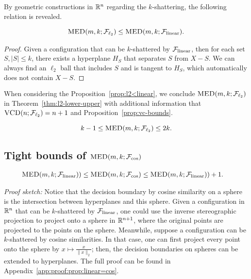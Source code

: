 \documentclass[10pt]{article}
\begin{document}
By geometric constructions in $\mathbb{R}^n$ regarding the $k$-shattering, the following relation is revealed.

\begin{proposition}\label{prop:l2<linear}

$$\textsc{MED}(m, k; \mathcal{F}_{\ell_{2}}) \leq \textsc{MED}(m, k; \mathcal{F}_{\rm linear}). $$

\end{proposition}
\begin{proof}
Given a configuration that can be $k$-shattered by $\mathcal{F}_{\rm linear}$, then for each set $S, |S| \leq k$, there exists a hyperplane $H_S$ that separates $S$ from $X-S$. We can always find an $\ell_2$ ball that includes $S$ and is tangent to $H_S$, which automatically does not contain $X-S$.
\end{proof}
When considering the Proposition~\ref{prop:l2<linear}, we conclude $\textsc{MED}(m, k;\mathcal{F}_{\ell_{2}})$ in Theorem~\ref{thm:l2-lower-upper} with additional information that $\textsc{VCD}(n;\mathcal{F}_{\ell_{2}}) = n+1$ and Proposition~\ref{prop:vc-bounds}.

\begin{theorem}\label{thm:l2-lower-upper}
    $$k-1\leq \textsc{MED}(m, k; \mathcal{F}_{\ell_{2}}) \leq 2k.$$
\end{theorem}

\subsection{Tight bounds of $\textsc{MED}(m, k; \mathcal{F}_{\cos})$}

\begin{proposition}\label{prop:linear=cos}
\begin{align*}
    \textsc{MED}(m, k; \mathcal{F}_{\rm linear})) &\leq \textsc{MED}(m, k; \mathcal{F}_{\cos}) \leq \textsc{MED}(m, k; \mathcal{F}_{\rm linear})) + 1.
\end{align*}
\end{proposition}
\noindent\textit{Proof sketch:} Notice that the decision boundary by cosine similarity on a sphere is the intersection between hyperplanes and this sphere. Given a configuration in $\mathbb{R}^n$ that can be $k$-shattered by $\mathcal{F}_{\rm linear}$, one could use the inverse stereographic projection to project onto a sphere in $\mathbb{R}^{n+1}$, where the original points are projected to the points on the sphere. Meanwhile, suppose a configuration can be $k$-shattered by cosine similarities. In that case, one can first project every point onto the sphere by $x\mapsto \frac{x}{\|x\|_2}$; then, the decision boundaries on spheres can be extended to hyperplanes. The full proof can be found in Appendix~\ref{app:proof:prop:linear=cos}.
\end{document}
